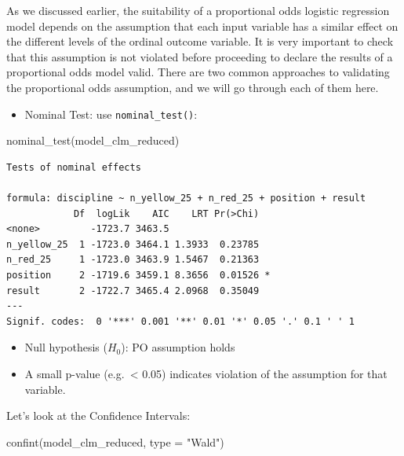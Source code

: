 \documentclass[
  letterpaper,
  DIV=11,
  numbers=noendperiod]{scrartcl}
\newenvironment{Shaded}{\begin{snugshade}}{\end{snugshade}}
\newcommand{\AttributeTok}[1]{\textcolor[rgb]{0.40,0.45,0.13}{#1}}
\newcommand{\FunctionTok}[1]{\textcolor[rgb]{0.28,0.35,0.67}{#1}}
\newcommand{\NormalTok}[1]{\textcolor[rgb]{0.00,0.23,0.31}{#1}}
\newcommand{\StringTok}[1]{\textcolor[rgb]{0.13,0.47,0.30}{#1}}
\providecommand{\tightlist}{%
  \setlength{\itemsep}{0pt}\setlength{\parskip}{0pt}}\usepackage{longtable,booktabs,array}
\begin{document}
As we discussed earlier, the suitability of a proportional odds logistic
regression model depends on the assumption that each input variable has
a similar effect on the different levels of the ordinal outcome
variable. It is very important to check that this assumption is not
violated before proceeding to declare the results of a proportional odds
model valid. There are two common approaches to validating the
proportional odds assumption, and we will go through each of them here.

\begin{itemize}
\tightlist
\item
  Nominal Test: use \texttt{nominal\_test()}:
\end{itemize}

\begin{Shaded}
\begin{Highlighting}[]
\FunctionTok{nominal\_test}\NormalTok{(model\_clm\_reduced)}
\end{Highlighting}
\end{Shaded}

\begin{verbatim}
Tests of nominal effects

formula: discipline ~ n_yellow_25 + n_red_25 + position + result
            Df  logLik    AIC    LRT Pr(>Chi)  
<none>         -1723.7 3463.5                  
n_yellow_25  1 -1723.0 3464.1 1.3933  0.23785  
n_red_25     1 -1723.0 3463.9 1.5467  0.21363  
position     2 -1719.6 3459.1 8.3656  0.01526 *
result       2 -1722.7 3465.4 2.0968  0.35049  
---
Signif. codes:  0 '***' 0.001 '**' 0.01 '*' 0.05 '.' 0.1 ' ' 1
\end{verbatim}

\begin{itemize}
\item
  Null hypothesis (\(H_0\)): PO assumption holds
\item
  A small p-value (e.g.~\textless{} 0.05) indicates violation of the
  assumption for that variable.
\end{itemize}

Let's look at the Confidence Intervals:

\begin{Shaded}
\begin{Highlighting}[]
\FunctionTok{confint}\NormalTok{(model\_clm\_reduced, }\AttributeTok{type =} \StringTok{"Wald"}\NormalTok{)}
\end{Highlighting}
\end{Shaded}
\end{document}
